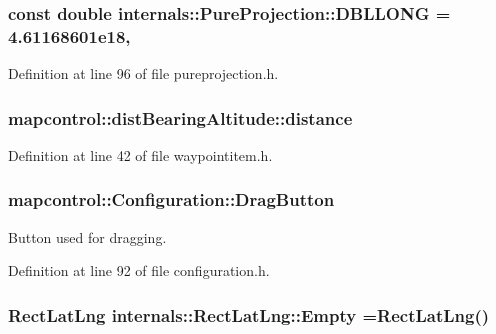 \hypertarget{group___o_p_map_widget_gaffa95138ab57a5c0267eb66399bbdc5c}{
\subsubsection[{D\-B\-L\-L\-O\-N\-G}]{\setlength{\rightskip}{0pt plus 5cm}const {\bf double} internals\-::\-Pure\-Projection\-::\-D\-B\-L\-L\-O\-N\-G = 4.\-61168601e18\hspace{0.3cm}{\ttfamily [static]}, {\ttfamily [protected]}}}\label{group___o_p_map_widget_gaffa95138ab57a5c0267eb66399bbdc5c}


Definition at line 96 of file pureprojection.\-h.

\hypertarget{group___o_p_map_widget_ga4f3ed7668339c6c63a158fe42d69f8ee}{
\subsubsection[{distance}]{ mapcontrol\-::dist\-Bearing\-Altitude\-::distance}}\label{group___o_p_map_widget_ga4f3ed7668339c6c63a158fe42d69f8ee}


Definition at line 42 of file waypointitem.\-h.

\hypertarget{group___o_p_map_widget_ga18190e2acae7a12ba6b598cf25244acf}{
\subsubsection[{Drag\-Button}]{\setlength{\rightskip}{0pt plus 5cm}mapcontrol\-::\-Configuration\-::\-Drag\-Button}}\label{group___o_p_map_widget_ga18190e2acae7a12ba6b598cf25244acf}


Button used for dragging. 



Definition at line 92 of file configuration.\-h.

\hypertarget{group___o_p_map_widget_ga0975dcf29ee445b5510f2c502940b50a}{
\subsubsection[{Empty}]{\setlength{\rightskip}{0pt plus 5cm}Rect\-Lat\-Lng internals\-::\-Rect\-Lat\-Lng\-::\-Empty =Rect\-Lat\-Lng()\hspace{0.3cm}{\ttfamily [static]}}}\label{group___o_p_map_widget_ga0975dcf29ee445b5510f2c502940b50a}


